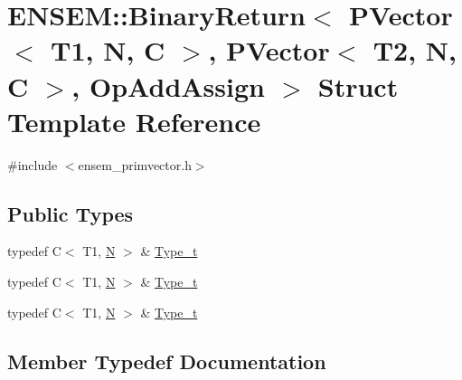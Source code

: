 \hypertarget{structENSEM_1_1BinaryReturn_3_01PVector_3_01T1_00_01N_00_01C_01_4_00_01PVector_3_01T2_00_01N_00_01C_01_4_00_01OpAddAssign_01_4}{}\section{E\+N\+S\+EM\+:\+:Binary\+Return$<$ P\+Vector$<$ T1, N, C $>$, P\+Vector$<$ T2, N, C $>$, Op\+Add\+Assign $>$ Struct Template Reference}
\label{structENSEM_1_1BinaryReturn_3_01PVector_3_01T1_00_01N_00_01C_01_4_00_01PVector_3_01T2_00_01N_00_01C_01_4_00_01OpAddAssign_01_4}


{\ttfamily \#include $<$ensem\+\_\+primvector.\+h$>$}

\subsection*{Public Types}
\begin{DoxyCompactItemize}
\item 
typedef C$<$ T1, \mbox{\hyperlink{adat__devel_2lib_2hadron_2operator__name__util_8cc_a7722c8ecbb62d99aee7ce68b1752f337}{N}} $>$ \& \mbox{\hyperlink{structENSEM_1_1BinaryReturn_3_01PVector_3_01T1_00_01N_00_01C_01_4_00_01PVector_3_01T2_00_01N_00_01C_01_4_00_01OpAddAssign_01_4_a935e1d81456568b9bcb1a6150c95a2e9}{Type\+\_\+t}}
\item 
typedef C$<$ T1, \mbox{\hyperlink{adat__devel_2lib_2hadron_2operator__name__util_8cc_a7722c8ecbb62d99aee7ce68b1752f337}{N}} $>$ \& \mbox{\hyperlink{structENSEM_1_1BinaryReturn_3_01PVector_3_01T1_00_01N_00_01C_01_4_00_01PVector_3_01T2_00_01N_00_01C_01_4_00_01OpAddAssign_01_4_a935e1d81456568b9bcb1a6150c95a2e9}{Type\+\_\+t}}
\item 
typedef C$<$ T1, \mbox{\hyperlink{adat__devel_2lib_2hadron_2operator__name__util_8cc_a7722c8ecbb62d99aee7ce68b1752f337}{N}} $>$ \& \mbox{\hyperlink{structENSEM_1_1BinaryReturn_3_01PVector_3_01T1_00_01N_00_01C_01_4_00_01PVector_3_01T2_00_01N_00_01C_01_4_00_01OpAddAssign_01_4_a935e1d81456568b9bcb1a6150c95a2e9}{Type\+\_\+t}}
\end{DoxyCompactItemize}


\subsection{Member Typedef Documentation}
\mbox{\label{structENSEM_1_1BinaryReturn_3_01PVector_3_01T1_00_01N_00_01C_01_4_00_01PVector_3_01T2_00_01N_00_01C_01_4_00_01OpAddAssign_01_4_a935e1d81456568b9bcb1a6150c95a2e9}} 
